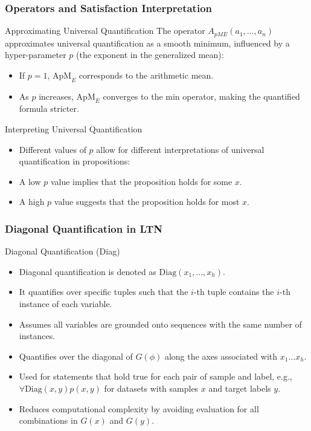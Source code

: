 \documentclass{beamer}
\begin{document}
\begin{frame}
  \frametitle{Operators and Satisfaction Interpretation}
  \begin{block}{Approximating Universal Quantification}
    The operator \( A_{pME} (a_1, \ldots, a_n) \) approximates
    universal quantification as a smooth minimum, influenced by a
    hyper-parameter \( p \) (the exponent in the generalized mean):
    \begin{itemize}
    \item If \( p = 1 \), \( \text{ApM}_E \) corresponds to the
      arithmetic mean.
    \item As \( p \) increases, \( \text{ApM}_E \) converges to the
      min operator, making the quantified formula stricter.
    \end{itemize}
  \end{block}

  \begin{block}{Interpreting Universal Quantification}
    \begin{itemize}
    \item Different values of \( p \) allow for different
      interpretations of universal quantification in propositions:
    \item A low \( p \) value implies that the proposition holds for some \( x \).
    \item A high \( p \) value suggests that the proposition holds for most \( x \).
    \end{itemize}
  \end{block}
\end{frame}

\begin{frame}
\frametitle{Diagonal Quantification in LTN}
\begin{block}{Diagonal Quantification (Diag)}
\begin{itemize}
    \item Diagonal quantification is denoted as \( \text{Diag}(x_1, \ldots, x_h) \).
    \item It quantifies over specific tuples such that the \( i \)-th tuple contains the \( i \)-th instance of each variable.
    \item Assumes all variables are grounded onto sequences with the same number of instances.
    \item Quantifies over the diagonal of \( G(\phi) \) along the axes associated with \( x_1 \ldots x_h \).
    \item Used for statements that hold true for each pair of sample and label, e.g., \( \forall\text{Diag}(x, y) p(x, y) \) for datasets with samples \( x \) and target labels \( y \).
    \item Reduces computational complexity by avoiding evaluation for all combinations in \( G(x) \) and \( G(y) \).
\end{itemize}
\end{block}
\end{frame}
\end{document}
